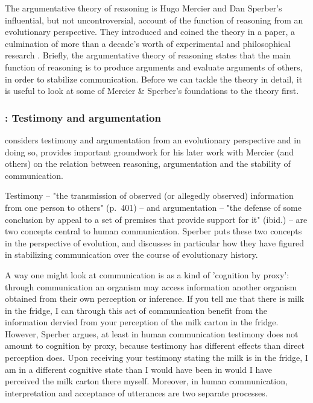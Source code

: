 The argumentative theory of reasoning is Hugo Mercier and Dan Sperber's influential, but not uncontroversial, account of the function of reasoning from an evolutionary perspective. They introduced and coined the theory in a \citeyear{MS11} paper, a culmination of more than a decade's worth of experimental and philosophical research \citep{Sperber01, Sperber10, MS09, Sperber00}.
Briefly, the argumentative theory of reasoning states that the main function of reasoning is to produce arguments and evaluate arguments of others, in order to stabilize communication.
Before we can tackle the theory in detail, it is useful to look at some of Mercier \& Sperber's foundations to the theory first.


\subsubsection{\citet{Sperber01}: Testimony and argumentation}

\citet{Sperber01} considers testimony and argumentation from an evolutionary perspective and in doing so, provides important groundwork for his later work with Mercier (and others) on the relation between reasoning, argumentation and the stability of communication.


Testimony -- "the transmission of observed (or allegedly observed) information from one person to others" (p.~401) -- and argumentation -- "the defense of some conclusion by appeal to a set of premises that provide support for it" (ibid.) -- are two concepts central to human communication.
Sperber puts these two concepts in the perspective of evolution, and discusses in particular how they have figured in stabilizing communication over the course of evolutionary history.

A way one might look at communication is as a kind of 'cognition by proxy': through communication an organism may access information another organism obtained from their own perception or inference. If you tell me that there is milk in the fridge, I can through this act of communication benefit from the information dervied from your perception of the milk carton in the fridge.
However, Sperber argues, at least in human communication testimony does not amount to cognition by proxy, because testimony has different effects than direct perception does. Upon receiving your testimony stating the milk is in the fridge, I am in a different cognitive state than I would have been in would I have perceived the milk carton there myself. Moreover, in human communication, interpretation and acceptance of utterances are two separate processes.

